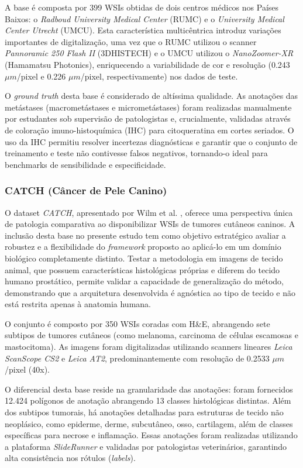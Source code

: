 A base é composta por 399 WSIs obtidas de dois centros médicos nos Países Baixos: o \textit{Radboud University Medical Center} (RUMC) e o \textit{University Medical Center Utrecht} (UMCU). Esta característica multicêntrica introduz variações importantes de digitalização, uma vez que o RUMC utilizou o scanner \textit{Pannoramic 250 Flash II} (3DHISTECH) e o UMCU utilizou o \textit{NanoZoomer-XR} (Hamamatsu Photonics), enriquecendo a variabilidade de cor e resolução (0.243 $\mu m$/pixel e 0.226 $\mu m$/pixel, respectivamente) nos dados de teste.

O \textit{ground truth} desta base é considerado de altíssima qualidade. As anotações das metástases (macrometástases e micrometástases) foram realizadas manualmente por estudantes sob supervisão de patologistas e, crucialmente, validadas através de coloração imuno-histoquímica (IHC) para citoqueratina em cortes seriados. O uso da IHC permitiu resolver incertezas diagnósticas e garantir que o conjunto de treinamento e teste não contivesse falsos negativos, tornando-o ideal para benchmarks de sensibilidade e especificidade.

\subsubsection{CATCH (Câncer de Pele Canino)}\label{subsubsec:dataset_catch}

O dataset \textit{CATCH}, apresentado por Wilm et al. \cite{Wilm2022CATCH}, oferece uma perspectiva única de patologia comparativa ao disponibilizar WSIs de tumores cutâneos caninos. A inclusão desta base no presente estudo tem como objetivo estratégico avaliar a robustez e a flexibilidade do \textit{framework} proposto ao aplicá-lo em um domínio biológico completamente distinto. Testar a metodologia em imagens de tecido animal, que possuem características histológicas próprias e diferem do tecido humano prostático, permite validar a capacidade de generalização do método, demonstrando que a arquitetura desenvolvida é agnóstica ao tipo de tecido e não está restrita apenas à anatomia humana.

O conjunto é composto por 350 WSIs coradas com H\&E, abrangendo sete subtipos de tumores cutâneos (como melanoma, carcinoma de células escamosas e mastocitoma). As imagens foram digitalizadas utilizando scanners lineares \textit{Leica ScanScope CS2} e \textit{Leica AT2}, predominantemente com resolução de 0.2533 $\mu m$/pixel (40x).

O diferencial desta base reside na granularidade das anotações: foram fornecidos 12.424 polígonos de anotação abrangendo 13 classes histológicas distintas. Além dos subtipos tumorais, há anotações detalhadas para estruturas de tecido não neoplásico, como epiderme, derme, subcutâneo, osso, cartilagem, além de classes específicas para necrose e inflamação. Essas anotações foram realizadas utilizando a plataforma \textit{SlideRunner} e validadas por patologistas veterinários, garantindo alta consistência nos rótulos (\textit{labels}).


